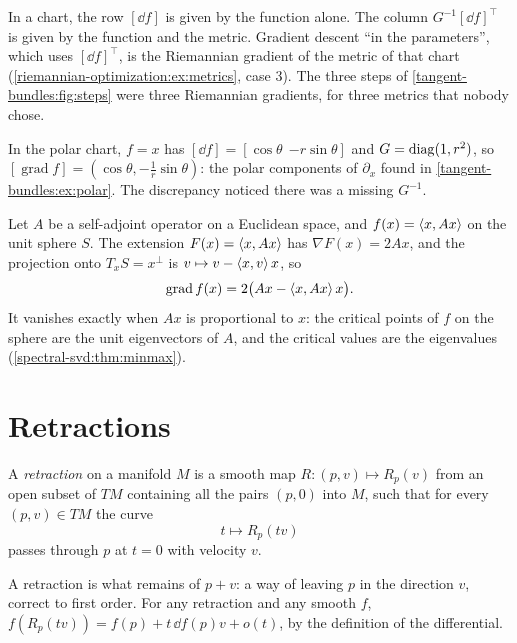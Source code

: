 \begin{notechapter}
\begin{keyidea}
In a chart, the row $[\dd f]$ is given by the function alone. The column
$G^{-1}[\dd f]^\top$ is given by the function and the metric. Gradient
descent ``in the parameters'', which uses $[\dd f]^\top$, is the
Riemannian gradient of the metric of that chart
(\cref{riemannian-optimization:ex:metrics}, case 3). The three steps of
\cref{tangent-bundles:fig:steps} were three Riemannian gradients, for
three metrics that nobody chose.
\end{keyidea}

\begin{example}
In the polar chart, $f = x$ has $[\dd f] = [\cos\theta\ \ {-r\sin\theta}]$
and $G = \operatorname{diag}(1, r^2)$, so
$[\operatorname{grad}f] = (\cos\theta, -\frac1r\sin\theta)$: the polar
components of $\partial_x$ found in \cref{tangent-bundles:ex:polar}. The
discrepancy noticed there was a missing $G^{-1}$.
\end{example}

\begin{example}
\label{riemannian-optimization:ex:rayleigh}
Let $A$ be a self-adjoint operator on a Euclidean space, and
$f(x) = \left\langle x, Ax \right\rangle$ on the unit sphere $S$. The extension
$F(x) = \left\langle x, Ax \right\rangle$ has $\nabla F(x) = 2Ax$, and the projection onto
$T_xS = x^\perp$ is $v\mapsto v - \left\langle x, v \right\rangle x$, so
\[
  \operatorname{grad}f(x) = 2\bigl(Ax - \left\langle x, Ax \right\rangle x\bigr) .
\]
It vanishes exactly when $Ax$ is proportional to $x$: the critical points
of $f$ on the sphere are the unit eigenvectors of $A$, and the critical
values are the eigenvalues (\cref{spectral-svd:thm:minmax}).
\end{example}

\section{Retractions}\label{riemannian-optimization:sec:retraction}

\begin{definition}[Retraction]\label{riemannian-optimization:def:retraction}
A \emph{retraction} on a manifold $M$ is a smooth map
$R:(p, v)\mapsto R_p(v)$ from an open subset of $TM$ containing all the
pairs $(p, 0)$ into $M$, such that for every $(p, v)\in TM$ the curve
\[
  t\mapsto R_p(tv)
\]
passes through $p$ at $t = 0$ with velocity $v$.
\end{definition}

A retraction is what remains of $p + v$: a way of leaving $p$ in the
direction $v$, correct to first order. For any retraction and any smooth
$f$, $f(R_p(tv)) = f(p) + t\,\dd f(p)v + o(t)$, by the definition of the
differential.


\end{notechapter}
